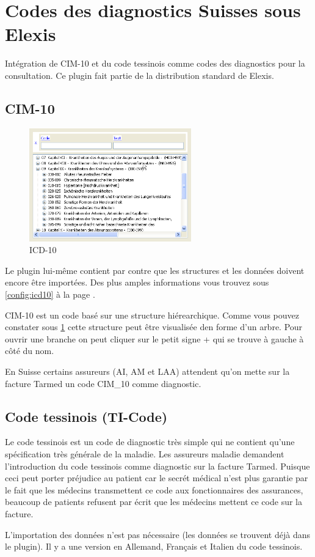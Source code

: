 \section{Codes des diagnostics Suisses sous Elexis}
Intégration de CIM-10 et du code tessinois comme codes des diagnostics pour la consultation. Ce plugin fait partie de la distribution standard de Elexis.
\subsection{CIM-10}
\begin{figure}
\includegraphics[width=7cm]{images/icd10}
\caption{ICD-10}
\label{fig:icd10}
\end{figure}

Le plugin lui-même contient par contre que les structures et les données doivent encore être importées. Des plus amples informations vous trouvez sous  \ref{config:icd10} à la page \pageref{config:icd10}.

\medskip

CIM-10 est un code basé sur une structure hiérearchique. Comme vous pouvez constater sous \ref{fig:icd10} cette structure peut être visualisée den forme d'un arbre. Pour ouvrir une branche on peut cliquer sur le petit signe + qui se trouve à gauche à côté du nom.

En Suisse certains assureurs (AI, AM et LAA) attendent qu'on mette sur la facture Tarmed un code CIM_10 comme diagnostic.

\subsection{Code tessinois (TI-Code)}
Le code tessinois est un code de diagnostic très simple qui ne contient qu'une spécification très générale de la maladie. Les assureurs maladie demandent l'introduction du code tessinois comme diagnostic sur la facture Tarmed. Puisque ceci peut porter préjudice au patient car le secrét médical n'est plus garantie par le fait que les médecins transmettent ce code aux fonctionnaires des assurances, beaucoup de patients refusent par écrit que les médecins mettent ce code sur la facture.

L'importation des données n'est pas nécessaire (les données se trouvent déjà dans le plugin). Il y a une version en Allemand, Français et Italien du code tessinois.